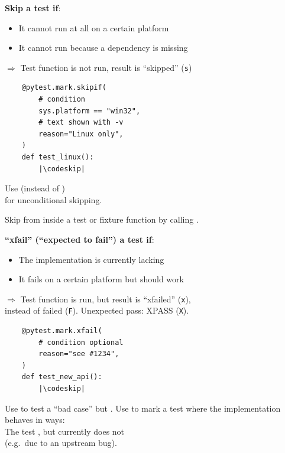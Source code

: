 
\textbf{Skip a test if}:
\begin{itemize}[itemsep=0pt]
    \item It cannot run at all on a certain platform
    \item It cannot run because a dependency is missing
\end{itemize}

\vspace{-.5em}
$\Rightarrow$ Test function is not run, result is \enquote{skipped} (\textcolor{termyellow}{\texttt{s}})

\vspace{-.5em}

\begin{verbatim}
    @pytest.mark.skipif(
        # condition
        sys.platform == "win32",
        # text shown with -v
        reason="Linux only",
    )
    def test_linux():
        |\codeskip|
\end{verbatim}
\vspace{-.5em}

Use  (instead of ) \\ for unconditional skipping.

Skip from inside a test or fixture function by calling .
\vspace{1em}

\textbf{\enquote{xfail} (\enquote{expected to fail}) a test if}:
\begin{itemize}[itemsep=0pt]
    \item The implementation is currently lacking
    \item It fails on a certain platform but should work
\end{itemize}

\vspace{-.5em}
$\Rightarrow$ Test function is run, but result is \enquote{xfailed} (\textcolor{termyellow}{\texttt{x}}), \\ \phantom{$\Rightarrow$} instead of failed (\textcolor{termred}{\texttt{F}}). Unexpected pass: XPASS (\textcolor{termyellow}{\texttt{X}}).

\begin{verbatim}
    @pytest.mark.xfail(
        # condition optional
        reason="see #1234",
    )
    def test_new_api():
        |\codeskip|
\end{verbatim}

Use  to test a \enquote{bad case} but . Use  to mark a test where the implementation behaves in  ways: \\
The test , but currently does not \\
(e.g.\ due to an upstream bug).
